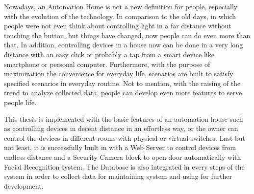 Nowadays, an Automation Home is not a new definition for people, especially with the evolution of the technology. In comparison to the old days, in which people were not even think about controlling light in a far distance without touching the button, but things have changed, now people can do even more than that. In addition, controlling devices in a house now can be done in a very long distance with an easy click or probably a tap from a smart device like smartphone or personal computer. Furthermore, with the purpose of maximization the convenience for everyday life, scenarios are built to satisfy specified scenarios in everyday routine. Not to mention, with the raising of the trend to analyze collected data, people can develop even more features to serve people life.

This thesis is implemented with the basic features of an automation house such as controlling devices in decent distance in an effortless way, or the owner can control the devices in different rooms with physical or virtual switches. Last but not least, it is successfully built in with a Web Server to control devices from endless distance and a Security Camera block to open door automatically with Facial Recognition system. The Database is also integrated in every steps of the system in order to collect data for maintaining system and using for further development.
